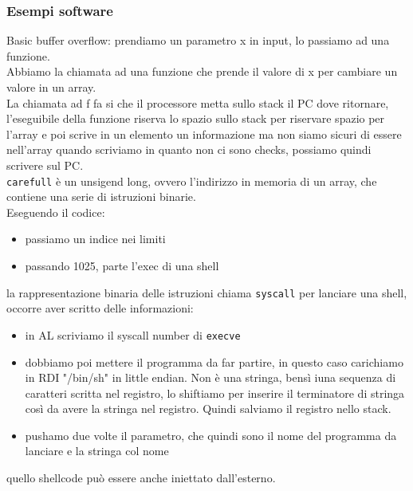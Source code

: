 \documentclass[12pt, oneside]{extbook}
\begin{document}
\subsubsection*{Esempi software}
Basic buffer overflow: prendiamo un parametro x in input, lo passiamo ad una funzione.\\Abbiamo la chiamata ad una funzione che prende il valore di x per cambiare un valore in un array.\\La chiamata ad f fa si che il processore metta sullo stack il PC dove ritornare, l'eseguibile della funzione riserva lo spazio sullo stack per riservare spazio per l'array e poi scrive in un elemento un informazione ma non siamo sicuri di essere nell'array quando scriviamo in quanto non ci sono checks, possiamo quindi scrivere sul PC.\\ \texttt{carefull} è un unsigend long, ovvero l'indirizzo in memoria di un array, che contiene una serie di istruzioni binarie.\\Eseguendo il codice:
\begin{itemize}
	\item passiamo un indice nei limiti
	\item passando 1025, parte l'exec di una shell
\end{itemize}
la rappresentazione binaria delle istruzioni chiama \texttt{syscall} per lanciare una shell, occorre aver scritto delle informazioni:
\begin{itemize}
	\item in AL scriviamo il syscall number di \texttt{execve}
	\item dobbiamo poi mettere il programma da far partire, in questo caso carichiamo in RDI "/bin/sh" in little endian. Non è una stringa, bensì iuna sequenza di caratteri scritta nel registro, lo shiftiamo per inserire il terminatore di stringa così da avere la stringa nel registro. Quindi salviamo il registro nello stack.
	\item pushamo due volte il parametro, che quindi sono il nome del programma da lanciare e la stringa col nome
\end{itemize}
quello shellcode può essere anche iniettato dall'esterno.
\end{document}
